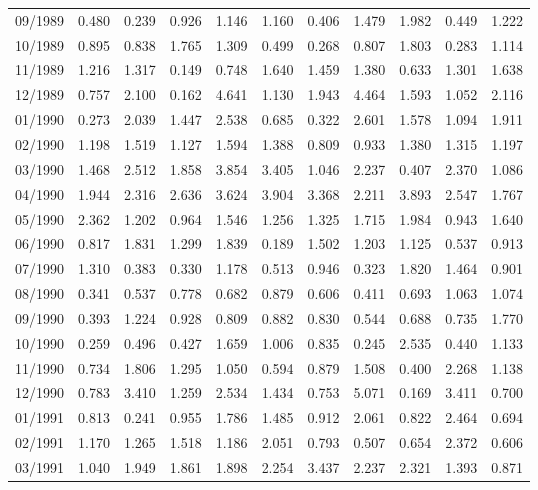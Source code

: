 \begin{tabular}{lrrrrrrrrrr}
09/1989 &  0.480 &  0.239 &  0.926 &  1.146 &  1.160 &  0.406 &  1.479 &  1.982 &  0.449 &  1.222 \\
10/1989 &  0.895 &  0.838 &  1.765 &  1.309 &  0.499 &  0.268 &  0.807 &  1.803 &  0.283 &  1.114 \\
11/1989 &  1.216 &  1.317 &  0.149 &  0.748 &  1.640 &  1.459 &  1.380 &  0.633 &  1.301 &  1.638 \\
12/1989 &  0.757 &  2.100 &  0.162 &  4.641 &  1.130 &  1.943 &  4.464 &  1.593 &  1.052 &  2.116 \\
01/1990 &  0.273 &  2.039 &  1.447 &  2.538 &  0.685 &  0.322 &  2.601 &  1.578 &  1.094 &  1.911 \\
02/1990 &  1.198 &  1.519 &  1.127 &  1.594 &  1.388 &  0.809 &  0.933 &  1.380 &  1.315 &  1.197 \\
03/1990 &  1.468 &  2.512 &  1.858 &  3.854 &  3.405 &  1.046 &  2.237 &  0.407 &  2.370 &  1.086 \\
04/1990 &  1.944 &  2.316 &  2.636 &  3.624 &  3.904 &  3.368 &  2.211 &  3.893 &  2.547 &  1.767 \\
05/1990 &  2.362 &  1.202 &  0.964 &  1.546 &  1.256 &  1.325 &  1.715 &  1.984 &  0.943 &  1.640 \\
06/1990 &  0.817 &  1.831 &  1.299 &  1.839 &  0.189 &  1.502 &  1.203 &  1.125 &  0.537 &  0.913 \\
07/1990 &  1.310 &  0.383 &  0.330 &  1.178 &  0.513 &  0.946 &  0.323 &  1.820 &  1.464 &  0.901 \\
08/1990 &  0.341 &  0.537 &  0.778 &  0.682 &  0.879 &  0.606 &  0.411 &  0.693 &  1.063 &  1.074 \\
09/1990 &  0.393 &  1.224 &  0.928 &  0.809 &  0.882 &  0.830 &  0.544 &  0.688 &  0.735 &  1.770 \\
10/1990 &  0.259 &  0.496 &  0.427 &  1.659 &  1.006 &  0.835 &  0.245 &  2.535 &  0.440 &  1.133 \\
11/1990 &  0.734 &  1.806 &  1.295 &  1.050 &  0.594 &  0.879 &  1.508 &  0.400 &  2.268 &  1.138 \\
12/1990 &  0.783 &  3.410 &  1.259 &  2.534 &  1.434 &  0.753 &  5.071 &  0.169 &  3.411 &  0.700 \\
01/1991 &  0.813 &  0.241 &  0.955 &  1.786 &  1.485 &  0.912 &  2.061 &  0.822 &  2.464 &  0.694 \\
02/1991 &  1.170 &  1.265 &  1.518 &  1.186 &  2.051 &  0.793 &  0.507 &  0.654 &  2.372 &  0.606 \\
03/1991 &  1.040 &  1.949 &  1.861 &  1.898 &  2.254 &  3.437 &  2.237 &  2.321 &  1.393 &  0.871 \\

\end{tabular}
